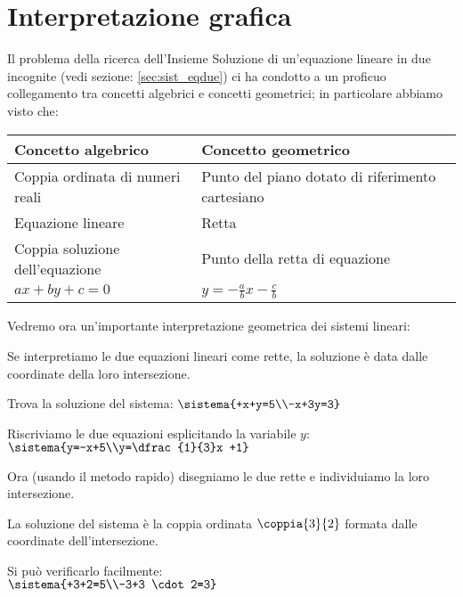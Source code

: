 \section{Interpretazione grafica}
Il problema della ricerca dell'Insieme Soluzione di
un'equazione lineare in due incognite (vedi sezione: \ref{sec:sist_eqdue}) 
ci ha condotto a un proficuo collegamento tra concetti algebrici e 
concetti geometrici; in particolare abbiamo visto che:

\begin{center}
 \begin{tabularx}{.9\textwidth}{XX}
\toprule
 Concetto algebrico & Concetto geometrico\\
 \midrule
Coppia ordinata di numeri reali & Punto del piano dotato di riferimento 
cartesiano\\
Equazione lineare & Retta \\
Coppia soluzione dell'equazione& Punto della retta di equazione \\
\(ax+by+c=0\) & \(y=-{\frac{a}{b}}x-\frac{c}{b}\)\\
\bottomrule
 \end{tabularx}

\end{center}
Vedremo ora un'importante interpretazione geometrica dei sistemi lineari:

\begin{definizione}{}{}
Se interpretiamo le due equazioni lineari come rette, la soluzione è data 
dalle coordinate della loro intersezione.
\end{definizione}

\begin{esempio}{}{}
Trova la soluzione del sistema:
\(\sistema{+x+y=5\\-x+3y=3}\)

\vspace{1em}
\begin{minipage}{.48\textwidth}
Riscriviamo le due equazioni esplicitando la variabile \(y\):
\(\sistema{y=-x+5\\y=\dfrac{1}{3}x +1}\)

Ora (usando il metodo rapido) disegniamo le due rette e individuiamo la loro 
intersezione.

La soluzione del sistema è la coppia ordinata \(\coppia{3}{2}\) formata dalle 
coordinate dell'intersezione.

Si può verificarlo facilmente:\\ 
\(\sistema{+3+2=5\\-3+3 \cdot 2=3}\)
\end{minipage}
\hfill
\begin{minipage}{.48\textwidth}
\begin{center} \intersezionediduerette \end{center}
\end{minipage}

\end{esempio}

